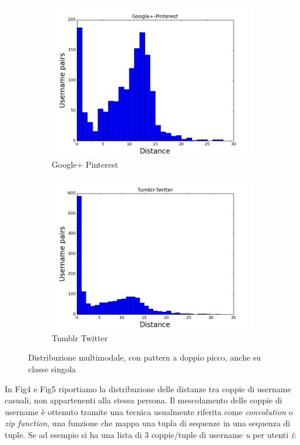\begin{figure}
\begin{subfigure}{.5\textwidth}
  \centering
  \includegraphics[width=.8\linewidth]{chapters/distanceplot/Google+-Pinterest.png}
  \caption{Google+ Pinterest}
  \label{fig:sfig1}
\end{subfigure}%
\begin{subfigure}{.5\textwidth}
  \centering
  \includegraphics[width=.8\linewidth]{chapters/distanceplot/Tumblr-Twitter.png}
  \caption{Tumblr Twitter}
  \label{fig:sfig2}
\end{subfigure}
\caption{Distribuzione multimodale, con pattern a doppio picco, anche su classe singola}
\label{fig:fig}
\end{figure}

In Fig4 e Fig5 riportiamo la distribuzione delle distanze tra coppie di username casuali, non appartenenti alla stessa persona. Il mescolamento delle coppie di username è ottenuto tramite una tecnica usualmente riferita come \textit{convolution} o \textit{zip function}, una funzione che mappa una tupla di sequenze in una sequenza di tuple. Se ad esempio si ha una lista di 3 coppie/tuple di username \textit{u} per utenti \textit{i}:

